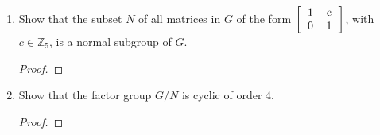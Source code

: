 \documentclass[paper=usletter, fontsize=12pt]{article}
\begin{document}
\begin{itemize}
\begin{enumerate}
\begin{enumerate}
                \item Show that the subset $N$ of all matrices in $G$ of the form $\left[\begin{tabular}{cc}
                            1 & c \\
                            0 & 1
                \end{tabular}\right]$, with $c \in \mathbb{Z}_5$, is a normal
                subgroup of $G$.
                \begin{proof}
                \end{proof}

                \item Show that the factor group $G/N$ is cyclic of order 4.
                \begin{proof}
                \end{proof}

            \end{enumerate}

        \end{enumerate}


    \end{itemize}
\end{document}
